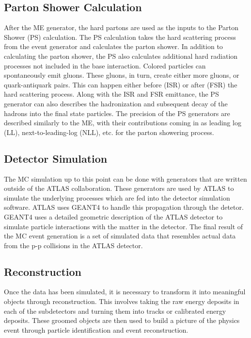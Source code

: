 \subsection{Parton Shower Calculation}
\indent  After the ME generator, the hard partons are used as the inputs to the Parton Shower (PS) calculation. The PS calculation takes the hard scattering process from the event generator and calculates the parton shower. In addition to calculating the parton shower, the PS also calculates additional hard radiation processes not included in the base interaction. Colored particles can spontaneously emit gluons. These gluons, in turn, create either more gluons, or quark-antiquark pairs. This can happen either before (ISR) or after (FSR) the hard scattering process. Along with the ISR and FSR emittance, the PS generator can also describes the hadronization and subsequent decay of the hadrons into the final state particles. The precision of the PS generators are described similarly to the ME, with their contributions coming in as leading log (LL), next-to-leading-log (NLL), etc. for the parton showering process. \newline
\subsection{Detector Simulation}
\indent The MC simulation up to this point can be done with generators that are written outside of the ATLAS collaboration. These generators are used by ATLAS to simulate the underlying processes which are fed into the detector simulation software. ATLAS uses GEANT4 to handle this propagation\cite{geant4} through the detetor. GEANT4 uses a detailed geometric description of the ATLAS detector to simulate particle interactions with the matter in the detector. \newline
\indent The final result of the MC event generation is a set of simulated data that resembles actual data from the p-p collisions in the ATLAS detector.
\subsection{Reconstruction}
Once the data has been simulated, it is necessary to transform it into meaningful objects through reconstruction. This involves taking the raw energy deposits in each of the subdetectors and turning them into tracks or calibrated energy deposits. These groomed objects are then used to build a picture of the physics event through particle identification and event reconstruction. 
